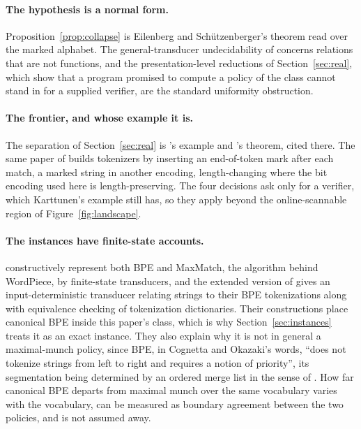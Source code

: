 \documentclass[11pt,a4paper]{article}
\theoremstyle{definition}
\theoremstyle{plain}
\begin{document}
\paragraph{The hypothesis is a normal form.} Proposition~\ref{prop:collapse} is Eilenberg and Schützenberger's theorem
\citep{eilenberg1974automata} read over the marked alphabet. The general-transducer undecidability of
\citet{filiot2016equivalence} concerns relations that are not functions, and the presentation-level reductions of
Section~\ref{sec:real}, which show that a program promised to compute a policy of the class cannot stand in for a
supplied verifier, are the standard uniformity obstruction.

\paragraph{The frontier, and whose example it is.} The separation of Section~\ref{sec:real} is
\citeauthor{karttunen1996directed}'s example and \citeauthor{choffrut1977sequential}'s theorem, cited there. The same
paper of \citet{karttunen1996directed} builds tokenizers by inserting an end-of-token mark after each match, a marked
string in another encoding, length-changing where the bit encoding used here is length-preserving. The four decisions
ask only for a verifier, which Karttunen's example still has, so they apply beyond the online-scannable region of
Figure~\ref{fig:landscape}.

\paragraph{The instances have finite-state accounts.} \citet{cognetta2025tokenization} constructively represent both BPE
and MaxMatch, the algorithm behind WordPiece, by finite-state transducers, and the extended version of
\citet{berglund2024bpedfa} gives an input-deterministic transducer relating strings to their BPE tokenizations along
with equivalence checking of tokenization dictionaries. Their constructions place canonical BPE inside this paper's
class, which is why Section~\ref{sec:instances} treats it as an exact instance. They also explain why it is not in
general a maximal-munch policy, since BPE, in Cognetta and Okazaki's words, ``does not tokenize strings from left to
right and requires a notion of priority'', its segmentation being determined by an ordered merge list in the sense of
\citet{sennrich2016subword}. How far canonical BPE departs from maximal munch over the same vocabulary varies with the
vocabulary, can be measured as boundary agreement between the two policies, and is not assumed away.
\end{document}
